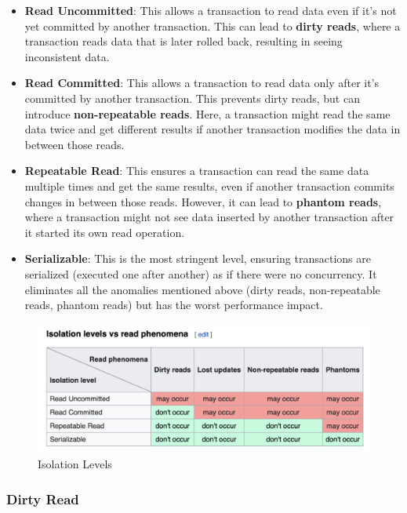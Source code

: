 \begin{itemize}
\item \textbf{Read Uncommitted}: This allows a transaction to read data even if it's not yet committed by another transaction. This can lead to \textbf{dirty reads}, where a transaction reads data that is later rolled back, resulting in seeing inconsistent data.

\item \textbf{Read Committed}: This allows a transaction to read data only after it's committed by another transaction. This prevents dirty reads, but can introduce \textbf{non-repeatable reads}. Here, a transaction might read the same data twice and get different results if another transaction modifies the data in between those reads.

\item \textbf{Repeatable Read}: This ensures a transaction can read the same data multiple times and get the same results, even if another transaction commits changes in between those reads. However, it can lead to \textbf{phantom reads}, where a transaction might not see data inserted by another transaction after it started its own read operation.

\item \textbf{Serializable}: This is the most stringent level, ensuring transactions are serialized (executed one after another) as if there were no concurrency. It eliminates all the anomalies mentioned above (dirty reads, non-repeatable reads, phantom reads) but has the worst performance impact.
\end{itemize}

\begin{figure}[H]
  \includegraphics[width=\linewidth]{images/chapter-jdbc/isolation_levels.png}
  \caption{Isolation Levels}
  \label{fig:paths}
\end{figure}


\subsubsection{Dirty Read}

